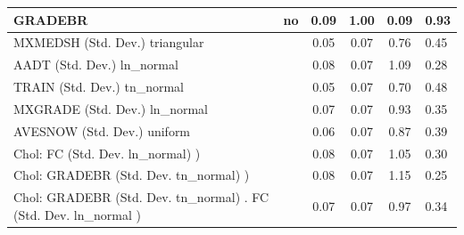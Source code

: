 \begin{table}
\begin{center}
\begin{tabular}{|l|l|c|c|c|l|}
			\hline
			GRADEBR & no & 0.09 & 1.00 & 0.09 & 0.93 \\
			\hline
			MXMEDSH (Std. Dev.) triangular &  & 0.05 & 0.07 & 0.76 & 0.45 \\
			\hline
			AADT (Std. Dev.) ln_normal &  & 0.08 & 0.07 & 1.09 & 0.28 \\
			\hline
			TRAIN (Std. Dev.) tn_normal &  & 0.05 & 0.07 & 0.70 & 0.48 \\
			\hline
			MXGRADE (Std. Dev.) ln_normal &  & 0.07 & 0.07 & 0.93 & 0.35 \\
			\hline
			AVESNOW (Std. Dev.) uniform &  & 0.06 & 0.07 & 0.87 & 0.39 \\
			\hline
			 Chol: FC (Std. Dev. ln_normal) ) &  & 0.08 & 0.07 & 1.05 & 0.30 \\
			\hline
			 Chol: GRADEBR (Std. Dev. tn_normal) ) &  & 0.08 & 0.07 & 1.15 & 0.25 \\
			\hline
			 Chol: GRADEBR (Std. Dev. tn_normal) . FC (Std. Dev.   ln_normal ) &  & 0.07 & 0.07 & 0.97 & 0.34 \\
			\hline
		\end{tabular}
	\end{center}
\end{table}